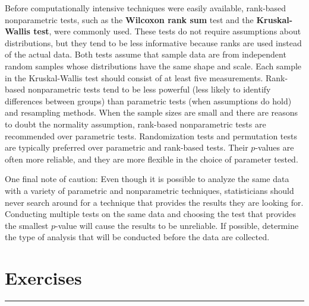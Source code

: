 \documentclass[
]{report}
\begin{document}
Before computationally intensive techniques were easily available, rank-based nonparametric tests, such as the \textbf{Wilcoxon rank sum} test and the \textbf{Kruskal-Wallis test}, were commonly used. These tests do not require assumptions about distributions, but they tend to be less informative because ranks are used instead of the actual data. Both tests assume that sample data are from independent random samples whose distributions have the same shape and scale. Each sample in the Kruskal-Wallis test should consist of at least five measurements. Rank-based nonparametric tests tend to be less powerful (less likely to identify differences between groups) than parametric tests (when assumptions do hold) and resampling methods. When the sample sizes are small and there are reasons to doubt the normality assumption, rank-based nonparametric tests are recommended over parametric tests. Randomization tests and
permutation tests are typically preferred over parametric and rank-based tests. Their \(\scriptstyle p\)-values are often more reliable, and they are more flexible in the choice of parameter tested.

One final note of caution: Even though it is possible to analyze the same data with a variety of parametric and nonparametric techniques, statisticians should never search around for a technique that provides the results they are looking for. Conducting multiple tests on the same data and choosing the test that provides the smallest \(\scriptstyle p\)-value will cause the results to be unreliable. If possible, determine the type of analysis that will be conducted before the data are collected.

\hypertarget{exercises}{%
\section*{Exercises}\label{exercises}}

\vspace{-2em}

\noindent

\rule{\linewidth}{0.4pt}
\end{document}
